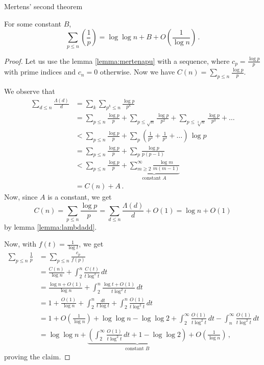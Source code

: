 \documentclass{article}
\begin{document}
\begin{theorem}
Mertens' second theorem \cite{Goldmakher}
\label{thm:mertens32}

For some constant $B$,
\begin{equation*}
    \sum_{p\leq n}\left(\frac{1}{p}\right) = \log\log n + B + O\left(\frac{1}{\log n}\right)\,.
\end{equation*}

\begin{proof}
Let us use the lemma \ref{lemma:mertenapu} with a sequence, where $c_p=\frac{\log p}{p}$ with prime indices and $c_n=0$ otherwise. Now we have $C(n) = \sum_{p\leq n} \frac{\log p}{p}$.

We observe that
\begin{align*}
    \sum_{d\leq n} \frac{\Lambda(d)}{d} & = \sum_k \sum_{p^k\leq n} \frac{\log p}{p^k}\\
    & = \sum_{p\leq n} \frac{\log p}{p} + \sum_{p\leq \sqrt{n}} \frac{\log p}{p^2} + \sum_{p\leq \sqrt[3]{n}} \frac{\log p}{p^3} + \dots\\
    & < \sum_{p\leq n} \frac{\log p}{p} + \sum_p \left(\frac{1}{p^2}+\frac{1}{p^3}+\dots\right)\,\log p\\
    & = \sum_{p\leq n} \frac{\log p}{p} + \sum_p \frac{\log p}{p(p-1)}\\
    & < \sum_{p\leq n} \frac{\log p}{p} + \underbrace{ \sum_{m\geq2}^\infty \frac{\log m}{m(m-1)}}_\text{constant $A$}\\
    & = C(n) + A\,.
\end{align*}
Now, since $A$ is a constant, we get
\begin{equation*}
    C(n) = \sum_{p\leq n} \frac{\log p}{p} = \sum_{d\leq n} \frac{\Lambda(d)}{d} + O(1) = \log n + O(1)
\end{equation*}
by lemma \ref{lemma:lambdadd}.

Now, with $f(t)=\frac{1}{\log t}$, we get
\begin{align*}
    \sum_{p\leq n} \frac{1}{p} & = \sum_{p\leq n} \frac{c_p}{f(p)}\\
    & = \frac{C(n)}{\log n} + \int_2^n \frac{C(t)}{t\log^2 t}\,dt\\
    & = \frac{\log n + O(1)}{\log n} + \int_2^n \frac{\log t + O(1)}{t\log^2 t}\,dt\\
    & = 1 + \frac{O(1)}{\log n} + \int_2^n \frac{dt}{t \log t} + \int_2^n \frac{O(1)}{t \log^2 t}\,dt\\
    & = 1 + O\left(\frac{1}{\log n}\right) + \log\log n - \log\log 2 + \int_2^\infty \frac{O(1)}{t \log^2 t}\,dt - \int_n^\infty \frac{O(1)}{t \log^2 t}\,dt\\
    & = \log\log n + \underbrace{\left(\int_2^\infty \frac{O(1)}{t \log^2 t}\,dt + 1 - \log \log 2\right)}_\text{constant $B$} + O\left(\frac{1}{\log n}\right)\,,
\end{align*}
proving the claim.

\end{proof}

\end{theorem}
\end{document}
